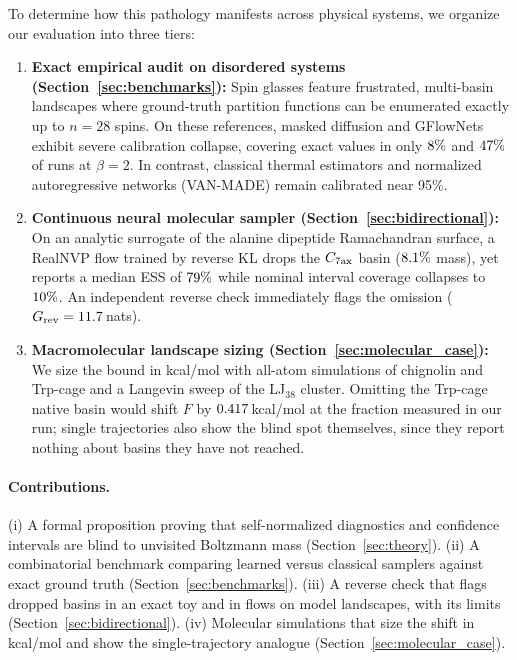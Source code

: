 To determine how this pathology manifests across physical systems, we organize our evaluation into three tiers:
\begin{enumerate}
\item \textbf{Exact empirical audit on disordered systems (Section~\ref{sec:benchmarks}):} Spin glasses feature frustrated, multi-basin landscapes where ground-truth partition functions can be enumerated exactly up to $n=28$ spins. On these references, masked diffusion and GFlowNets exhibit severe calibration collapse, covering exact values in only $8\%$ and $47\%$ of runs at $\beta=2$. In contrast, classical thermal estimators and normalized autoregressive networks (VAN-MADE) remain calibrated near 95\%.
\item \textbf{Continuous neural molecular sampler (Section~\ref{sec:bidirectional}):} On an analytic surrogate of the alanine dipeptide Ramachandran surface, a RealNVP flow trained by reverse KL drops the $C_{7\rm ax}$ basin ($8.1\%$ mass), yet reports a median ESS of $79\%$ while nominal interval coverage collapses to $10\%$. An independent reverse check immediately flags the omission ($G_{\rm rev} = 11.7$\,nats).
\item \textbf{Macromolecular landscape sizing (Section~\ref{sec:molecular_case}):} We size the bound in kcal/mol with all-atom simulations of chignolin and Trp-cage and a Langevin sweep of the LJ$_{38}$ cluster. Omitting the Trp-cage native basin would shift $F$ by $0.417$\,kcal/mol at the fraction measured in our run; single trajectories also show the blind spot themselves, since they report nothing about basins they have not reached.
\end{enumerate}

\paragraph{Contributions.} (i) A formal proposition proving that self-normalized diagnostics and confidence intervals are blind to unvisited Boltzmann mass (Section~\ref{sec:theory}). (ii) A combinatorial benchmark comparing learned versus classical samplers against exact ground truth (Section~\ref{sec:benchmarks}). (iii) A reverse check that flags dropped basins in an exact toy and in flows on model landscapes, with its limits (Section~\ref{sec:bidirectional}). (iv) Molecular simulations that size the shift in kcal/mol and show the single-trajectory analogue (Section~\ref{sec:molecular_case}).